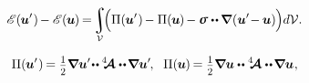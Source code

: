 \nopagebreak\vspace{-0.2em}
\begin{equation*}
\potentialenergyfunctional \hspace{.16ex}
(\hspace{-0.1ex}
\bm{u}'
\hspace{.1ex}) \hspace{-0.2ex}
- \potentialenergyfunctional \hspace{.16ex}
(\hspace{-0.1ex}
\bm{u}
\hspace{-0.1ex}) \hspace{-0.2ex}
= \hspace{-0.3ex}
\scalebox{.9}{$\displaystyle
\integral\displaylimits_{\mathcal{V}}$} \hspace{-0.44ex}
\Bigl(
\potentialenergydensity (\hspace{-0.1ex}\bm{u}'\hspace{.1ex}) \hspace{-0.2ex}
- \potentialenergydensity (\hspace{-0.1ex}\bm{u}\hspace{-0.1ex}) \hspace{-0.2ex}
- \linearstress
\dotdotp \hspace{-0.1ex}
\boldnabla \hspace{.1ex}
(
   \bm{u}' \hspace{-0.4ex}
   - \hspace{-0.1ex}
   \bm{u}
) \hspace{-0.1ex}
\Bigr)
d\mathcal{V}
.
\end{equation*}

\noindent
{}

\nopagebreak\vspace{-0.2em}
\begin{equation*}
\potentialenergydensity (\hspace{-0.1ex}\bm{u}'\hspace{.1ex}) \hspace{-0.2ex}
= \smalldisplaystyleonehalf
\boldnabla \bm{u}'
\hspace{-0.4ex} \dotdotp \hspace{-0.1ex}
\stiffnesstensor
\dotdotp \hspace{-0.25ex}
\boldnabla \bm{u}'
\hspace{-0.2ex} ,
\hspace{.6em}
\potentialenergydensity (\hspace{-0.1ex}
\bm{u}
\hspace{-0.1ex}) \hspace{-0.2ex}
= \smalldisplaystyleonehalf
\boldnabla \bm{u}
\dotdotp
\stiffnesstensor
\dotdotp \hspace{-0.25ex}
\boldnabla \bm{u} \hspace{.1ex}
,
\end{equation*}

